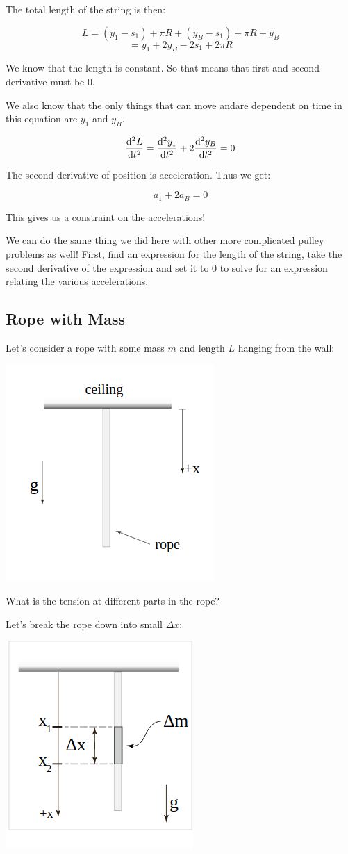 \documentclass{report}
\begin{document}
The total length of the string is then:

$$L = (y_1 - s_1) + \pi R + (y_B-s_1)+\pi R + y_B$$
$$=y_1+2y_B-2s_1+2\pi R$$

We know that the length is constant. So that means that first and second derivative must be 0.

We also know that the only things that can move andare dependent on time in this equation are $y_1$ and $y_B$.

$$\dv[2]{L}{t} = \dv[2]{y_1}{t} + 2\dv[2]{y_B}{t} = 0$$

The second derivative of position is acceleration. Thus we get:


$$
\boxed{
a_1 + 2a_B = 0
}
$$

This gives us a constraint on the accelerations!

We can do the same thing we did here with other more complicated pulley problems as well! First, find an expression for the length of the string, take the second derivative of the expression and set it to 0 to solve for an expression relating the various accelerations.

\subsection{Rope with Mass}
Let's consider a rope with some mass $m$ and length $L$ hanging from the wall:

\includegraphics[scale=0.6]{mass_rope.png}

What is the tension at different parts in the rope?

Let's break the rope down into small $\Delta x$:

\includegraphics[scale=0.7]{mass_rope_analysis.png}
\end{document}
